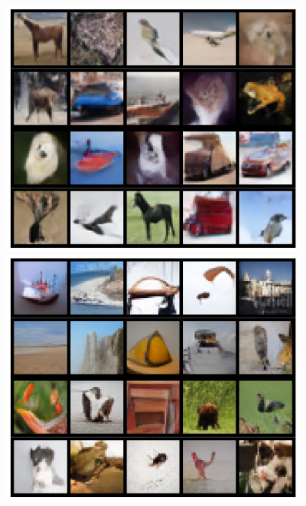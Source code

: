 \documentclass{article}
\theoremstyle{remark}
\theoremstyle{plain}
\begin{document}
{{\begin{figure}[!t]
\begin{center}
\begin{minipage}{0.9\textwidth}
    \end{minipage}
    \end{center}
    \begin{center}
    \begin{minipage}{0.445\linewidth}
        \includegraphics[width=\linewidth]{CIFAR10_final_curated_4by5.png}
    \end{minipage}
    \begin{minipage}{0.445\linewidth}
        \includegraphics[width=\linewidth]{ImageNet_final_curated_4by5.png}
        

\end{minipage}
\end{center}
\end{figure}}}
\end{document}
